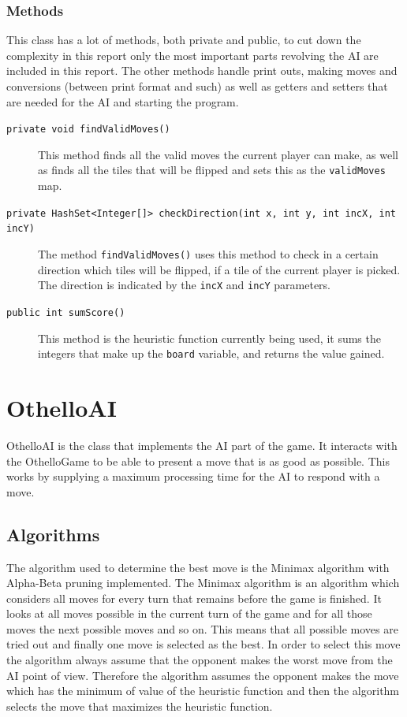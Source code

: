 \documentclass[a4paper]{article}
\begin{document}
\subsubsection{Methods}
This class has a lot of methods, both private and public, to cut down the complexity in this report only the most important parts revolving the AI are included in this report. The other methods handle print outs, making moves and conversions (between print format and such) as well as getters and setters that are needed for the AI and starting the program.  
\begin{description}
\item[\texttt{private void findValidMoves()}] This method finds all the valid moves the current player can make, as well as finds all the tiles that will be flipped and sets this as the \texttt{validMoves} map.
\item[\texttt{private HashSet<Integer[]> checkDirection(int x, int y, int incX, int incY)}] The method \texttt{findValidMoves()} uses this method to check in a certain direction which tiles will be flipped, if a tile of the current player is picked. The direction is indicated by the \texttt{incX} and \texttt{incY} parameters.
\item[\texttt{public int sumScore()}] This method is the heuristic function currently being used, it sums the integers that make up the \texttt{board} variable, and returns the value gained.
\end{description} 

\section{OthelloAI}
OthelloAI is the class that implements the AI part of the game. It interacts with the OthelloGame to be able to present a move that is as good as possible. This works by supplying a maximum processing time for the AI to respond with a move. 

\subsection{Algorithms}
The algorithm used to determine the best move is the Minimax algorithm with Alpha-Beta pruning implemented. The Minimax algorithm is an algorithm which considers all moves for every turn that remains before the game is finished. It looks at all moves possible in the current turn of the game and for all those moves the next possible moves and so on. This means that all possible moves are tried out and finally one move is selected as the best. In order to select this move the algorithm always assume that the opponent makes the worst move from the AI point of view. Therefore the algorithm assumes the opponent makes the move which has the minimum of value of the heuristic function and then the algorithm selects the move that maximizes the heuristic function.
\end{document}
